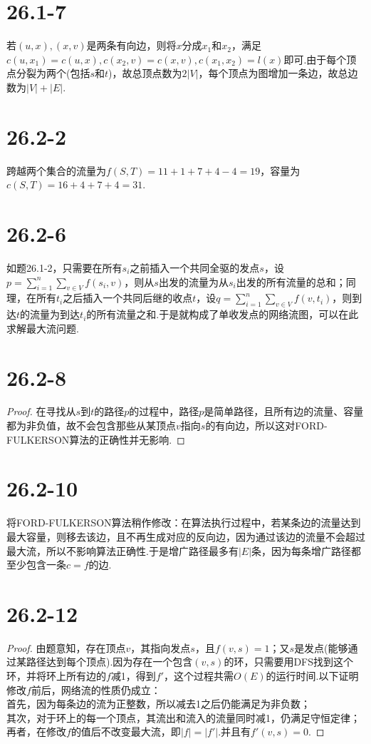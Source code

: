 \documentclass[twocolumn]{article}
\newenvironment{SChinese}{%
	\CJKfamily{gbsn}%
	\CJKtilde
	\CJKnospace}{}
\begin{document}
\begin{CJK}{UTF8}{}
\begin{SChinese}
			\section*{26.1-7}
				若$(u,x),(x,v)$是两条有向边，则将$x$分成$x_1$和$x_2$，满足$c(u,x_1)=c(u,x),c(x_2,v)=c(x,v),c(x_1,x_2)=l(x)$即可.由于每个顶点分裂为两个(包括$s$和$t$)，故总顶点数为$2|V|$，每个顶点为图增加一条边，故总边数为$|V|+|E|$.
			\section*{26.2-2}
				跨越两个集合的流量为$f(S,T)=11+1+7+4-4=19$，容量为$c(S,T)=16+4+7+4=31$.
			\section*{26.2-6}
				如题26.1-2，只需要在所有$s_i$之前插入一个共同全驱的发点$s$，设$p=\sum_{i=1}^{n}\sum_{v\in V}^{}f(s_i,v)$，则从$s$出发的流量为从$s_i$出发的所有流量的总和；同理，在所有$t_i$之后插入一个共同后继的收点$t$，设$q=\sum_{i=1}^{n}\sum_{v\in V}^{}f(v,t_i)$，则到达$t$的流量为到达$t_i$的所有流量之和.于是就构成了单收发点的网络流图，可以在此求解最大流问题.
			\section*{26.2-8}
				\begin{proof}
					在寻找从$s$到$t$的路径$p$的过程中，路径$p$是简单路径，且所有边的流量、容量都为非负值，故不会包含那些从某顶点$v$指向$s$的有向边，所以这对FORD-FULKERSON算法的正确性并无影响.
				\end{proof}
			\section*{26.2-10}
				将FORD-FULKERSON算法稍作修改：在算法执行过程中，若某条边的流量达到最大容量，则移去该边，且不再生成对应的反向边，因为通过该边的流量不会超过最大流，所以不影响算法正确性.于是增广路径最多有$|E|$条，因为每条增广路径都至少包含一条$c=f$的边.
			\section*{26.2-12}
				\begin{proof}
					由题意知，存在顶点$v$，其指向发点$s$，且$f(v,s)=1$；又$s$是发点(能够通过某路径达到每个顶点).因为存在一个包含$(v,s)$的环，只需要用DFS找到这个环，并将环上所有边的$f$减1，得到$f'$，这个过程共需$O(E)$的运行时间.以下证明修改$f$前后，网络流的性质仍成立：\\
					首先，因为每条边的流为正整数，所以减去1之后仍能满足为非负数；\\
					其次，对于环上的每一个顶点，其流出和流入的流量同时减1，仍满足守恒定律；\\
					再者，在修改$f$的值后不改变最大流，即$|f|=|f'|$.并且有$f'(v,s)=0$.
				\end{proof}

\end{SChinese}
\end{CJK}
\end{document}
